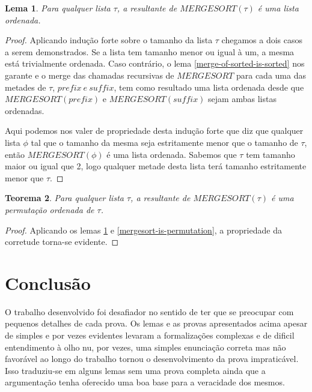 \documentclass[12pt]{article}
\newtheorem{theorem}{Teorema}[section]
\newtheorem{lemma}[theorem]{Lema}
\theoremstyle{definition}
\begin{document}
\begin{lemma}
\label{mergesort-sorts}
        Para qualquer lista $\tau$, a resultante de $MERGESORT(\tau)$ é uma lista ordenada.
\end{lemma}

\begin{proof}
        Aplicando indução forte sobre o tamanho da lista $\tau$ chegamos a dois casos a serem demonstrados.
        Se a lista tem tamanho menor ou igual à um, a mesma está trivialmente ordenada. Caso contrário,
        o lema \ref{merge-of-sorted-is-sorted} nos garante e o merge das chamadas recursivas de $MERGESORT$
        para cada uma das metades de $\tau$, $prefix\ e\ suffix$,  tem como resultado uma lista ordenada
        desde que $MERGESORT(prefix)$ e $MERGESORT(suffix)$ sejam ambas listas ordenadas.

        Aqui podemos nos valer de propriedade desta indução forte que diz que qualquer lista $\phi$ tal que
        o tamanho da mesma seja estritamente menor que o tamanho de $\tau$, então $MERGESORT(\phi)$ é uma lista
        ordenada. Sabemos que $\tau$ tem tamanho maior ou igual que 2, logo qualquer metade desta lista
        terá tamanho estritamente menor que $\tau$.
\end{proof}

\begin{theorem}
\label{mergesort-is-correct}
        Para qualquer lista $\tau$, a resultante de $MERGESORT(\tau)$ é uma permutação ordenada de $\tau$.
\end{theorem}

\begin{proof}
        Aplicando os lemas \ref{mergesort-sorts} e \ref{mergesort-is-permutation}, a propriedade da corretude torna-se
        evidente.
\end{proof}



\section{Conclusão}
\label{conclusion}

O trabalho desenvolvido foi desafiador no sentido de ter que se preocupar com pequenos detalhes de cada prova. 
Os lemas e as provas apresentados acima apesar de simples e por vezes evidentes levaram a formalizações
complexas e de dificil entendimento à olho nu, por vezes, uma simples enunciação correta mas não favorável
ao longo do trabalho tornou o desenvolvimento da prova impraticável. Isso traduziu-se em alguns lemas
sem uma prova completa ainda que a argumentação tenha oferecido uma boa base para a veracidade dos mesmos.
\end{document}
